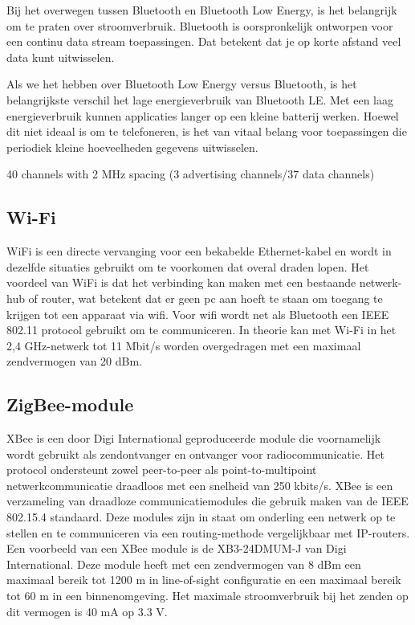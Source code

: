 Bij het overwegen tussen Bluetooth en Bluetooth Low Energy, is het belangrijk om te praten over stroomverbruik. Bluetooth is oorspronkelijk ontworpen voor een continu data stream toepassingen. Dat betekent dat je op korte afstand veel data kunt uitwisselen.

Als we het hebben over Bluetooth Low Energy versus Bluetooth, is het belangrijkste verschil het lage energieverbruik van Bluetooth LE. Met een laag energieverbruik kunnen applicaties langer op een kleine batterij werken. Hoewel dit niet ideaal is om te telefoneren, is het van vitaal belang voor toepassingen die periodiek kleine hoeveelheden gegevens uitwisselen.

40 channels with 2 MHz spacing (3 advertising channels/37 data channels)


\subsection{Wi-Fi}
WiFi is een directe vervanging voor een bekabelde Ethernet-kabel en wordt in dezelfde situaties gebruikt om te voorkomen dat overal draden lopen. Het voordeel van WiFi is dat het verbinding kan maken met een bestaande netwerk-hub of router, wat betekent dat er geen pc aan hoeft te staan om toegang te krijgen tot een apparaat via wifi. Voor wifi wordt net als Bluetooth een IEEE 802.11 protocol gebruikt om te communiceren. In theorie kan met Wi-Fi in het 2,4 GHz-netwerk tot 11 Mbit/s worden overgedragen met een maximaal zendvermogen van 20 dBm.


\subsection{ZigBee-module}
XBee is een door Digi International geproduceerde module die voornamelijk wordt gebruikt als zendontvanger en ontvanger voor radiocommunicatie. Het protocol ondersteunt zowel peer-to-peer als point-to-multipoint netwerkcommunicatie draadloos met een snelheid van 250 kbits/s. XBee is een verzameling van draadloze communicatiemodules die gebruik maken van de IEEE 802.15.4 standaard. Deze modules zijn in staat om onderling een netwerk op te stellen en te communiceren via een routing-methode vergelijkbaar met IP-routers. Een voorbeeld van een XBee module is de XB3-24DMUM-J van Digi International. Deze module heeft met een zendvermogen van 8 dBm een maximaal bereik tot 1200 m in line-of-sight configuratie en een maximaal bereik tot 60 m in een binnenomgeving. Het maximale stroomverbruik bij het zenden op dit vermogen is 40 mA op 3.3 V.

